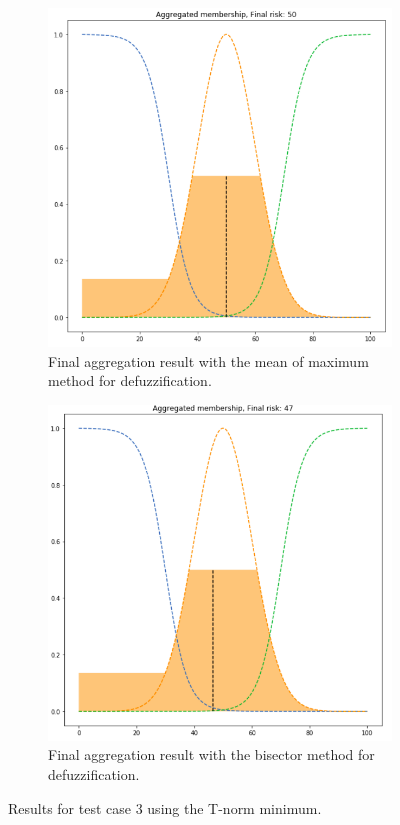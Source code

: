 \documentclass[conference]{IEEEtran}
\begin{document}
\begin{figure}[ht]
\begin{subfigure}{.5\textwidth}
  \label{fig:3min-centroid}
\end{subfigure}
\begin{subfigure}{.5\textwidth}
  \centering
  \includegraphics[width=.8\linewidth]{figures/third/min-mom.png}  
  \caption{Final aggregation result with the mean of maximum method for defuzzification.}
  \label{fig:3min-mom}
\end{subfigure}
\begin{subfigure}{.5\textwidth}
  \centering
  \includegraphics[width=.8\linewidth]{figures/third/min-bisector.png}  
  \caption{Final aggregation result with the bisector method for defuzzification.}
  \label{fig:3min-bisector}
\end{subfigure}
\caption{Results for test case 3 using the T-norm minimum.}
\label{fig:testcase3min}
\end{figure}
\end{document}
